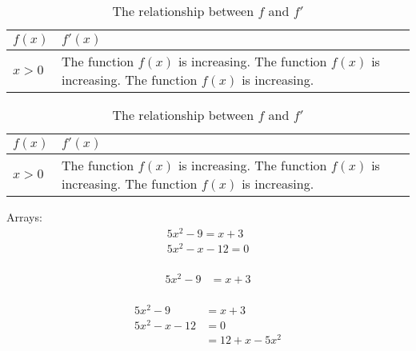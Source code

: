 \documentclass[11pt]{article}
\begin{document}
    \begin{table}[H] 
    \centering 
    \def\arraystretch{1.2} 
        \caption{The relationship between $f$ and $f'$}
        \begin{tabular}{|l|l|}
            \hline 
            $f(x)$ & $f'(x)$ \\ \hline 
            $x>0$ & The function $f(x)$ is increasing. The function $f(x)$ is increasing. The function $f(x)$ is increasing. \\ \hline %
        \end{tabular} 
    \end{table}    

    \begin{table}[H] 
        \centering 
        \def\arraystretch{1.2} 
            \caption{The relationship between $f$ and $f'$}
            \begin{tabular}{|l|p{3in}|} %
                \hline 
                $f(x)$ & $f'(x)$ \\ \hline 
                $x>0$ & The function $f(x)$ is increasing. The function $f(x)$ is increasing. The function $f(x)$ is increasing. \\ \hline %
            \end{tabular} 
        \end{table}    

    Arrays:
    \begin{align}  %
        5x^2 - 9 = x + 3 \\
        5x^2 - x - 12 = 0 \\
    \end{align}

    \begin{align*} %
        5x^2 - 9 &= x + 3 \\ %
    \end{align*}   

    \begin{align} 
        5x^2 - 9 &= x + 3 \\ %
        5x^2 - x - 12 &= 0 \\
        &= 12 + x - 5x^2
    \end{align}
\end{document}
